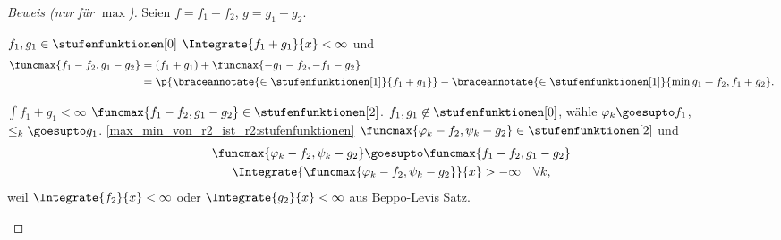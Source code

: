 \begin{proof}[Beweis (nur für \( \max \))]
  Seien \( f=f_1-f_2 \), \( g=g_1-g_2 \).
  \begin{eigenschaftenenumerate}
    \item\label{max_min_von_r2_ist_r2:stufenfunktionen} \( f_1,g_1\in \stufenfunktionen[0] \) \timplies \( \Integrate{f_1+g_1}{x}<\infty \) und 
    \begin{align*}
      \funcmax{f_1-f_2,g_1-g_2}&=(f_1+g_1)+\funcmax{-g_1-f_2,-f_1-g_2}\\
      &=\p{\braceannotate{\in \stufenfunktionen[1]}{f_1+g_1}}-\braceannotate{\in \stufenfunktionen[1]}{\min{g_1+f_2,f_1+g_2}}.
    \end{align*}
    \item \( \int f_1+g_1<\infty \) \timplies \( \funcmax{f_1-f_2,g_1-g_2}\in \stufenfunktionen[2] \). \( f_1,g_1\not\in \stufenfunktionen[0] \), wähle \( \varphi_k\goesupto f_1 \), \( \leq_k\goesupto g_1 \).  \ref{max_min_von_r2_ist_r2:stufenfunktionen} \timplies \( \funcmax{\varphi_k-f_2,\psi_k-g_2}\in \stufenfunktionen[2] \) und
    \begin{gather*}
      \funcmax{\varphi_k-f_2,\psi_k-g_2}\goesupto \funcmax{f_1-f_2,g_1-g_2}\\
      \Integrate{\funcmax{\varphi_k-f_2,\psi_k-g_2}}{x} >-\infty\quad \forall  k,
    \end{gather*}
    weil \( \Integrate{f_2}{x}<\infty \) oder \( \Integrate{g_2}{x}<\infty \) \timplies \Beh aus Beppo-Levis Satz.
  \end{eigenschaftenenumerate}
\end{proof}